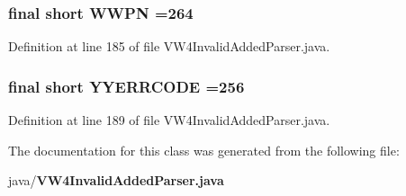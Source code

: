 \subsubsection[{W\+W\+P\+N}]{\setlength{\rightskip}{0pt plus 5cm}final short W\+W\+P\+N =264\hspace{0.3cm}{\ttfamily [static]}}\label{classorg_1_1smallfoot_1_1parser_1_1zone_1_1VW4InvalidAddedParser_ab9a3de9a217cad4ad00a26e6324f275e}


Definition at line 185 of file V\+W4\+Invalid\+Added\+Parser.\+java.

\subsubsection[{Y\+Y\+E\+R\+R\+C\+O\+D\+E}]{\setlength{\rightskip}{0pt plus 5cm}final short Y\+Y\+E\+R\+R\+C\+O\+D\+E =256\hspace{0.3cm}{\ttfamily [static]}}\label{classorg_1_1smallfoot_1_1parser_1_1zone_1_1VW4InvalidAddedParser_a1c58472ea6621d2f613831e08d10dba3}


Definition at line 189 of file V\+W4\+Invalid\+Added\+Parser.\+java.



The documentation for this class was generated from the following file\+:\begin{DoxyCompactItemize}
\item 
java/{\bf V\+W4\+Invalid\+Added\+Parser.\+java}\end{DoxyCompactItemize}
